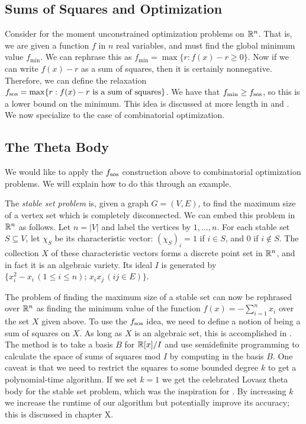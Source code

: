 \subsection{Sums of Squares and Optimization}
Consider for the moment unconstrained optimization problems on $\mathbb{R}^n$. 
That  is, we are given a function $f$ in $n$ real variables, and must find the global minimum value $f_{\min}$. 
We can rephrase this as $f_{\min} = \max \{r: f(x) - r \ge 0\}$. 
Now if we can write $f(x) - r$ as a sum of squares, then it is certainly nonnegative. 
Therefore, we can define the relaxation $f_{\textup{sos}} = \max \{r: f(x) - r \textup{ is a sum of squares}\}$.
We have that $f_{\min} \ge f_{\textup{sos}}$, so this is a lower bound on the minimum. 
This idea is discussed at more length in \cite{sostools} and \cite{lasserre}. 
We now specialize to the case of combinatorial optimization.

\subsection{The Theta Body}
We would like to apply the $f_{\textup{sos}}$ construction above to combinatorial optimization problems. 
We will explain how to do this through an example.

The {\em stable set problem} is, given a graph $G = (V,E)$, to find the maximum size of a vertex set which is completely disconnected. 
We can embed this problem in $\mathbb{R}^n$ as follows. 
Let $n = |V|$ and label the vertices by $1, \ldots, n$. 
For each stable set $S \subseteq V$, let $\chi_S$ be its characteristic vector: $(\chi_S)_i = 1$ if $i \in S$, and 0 if $i \notin S$.
The collection $X$ of these characteristic vectors forms a discrete point set in $\mathbb{R}^n$, and in fact it is an algebraic variety. 
Its ideal $I$ is generated by $\{x_i^2 - x_i \, (1\le i \le n);\, x_ix_j\, (ij \in E) \}$.

The problem of finding the maximum size of a stable set can now be rephrased over $\mathbb{R}^n$ as finding the minimum value of the function $f(x) = - \sum_{i=1}^n x_i$ over the set $X$ given above. 
To use the $f_{\textup{sos}}$ idea, we need to define a notion of being a sum of squares on $X$. As long as $X$ is an algebraic set, this is accomplished in \cite{glpt}. 
The method is to take a basis $B$ for $\mathbb{R}[x]/I$ and use semidefinite programming to calculate the space of sums of squares mod $I$ by computing in the basis $B$.
One caveat is that we need to restrict the squares to some bounded degree $k$ to get a polynomial-time algorithm. 
If we set $k=1$ we get the celebrated Lovasz theta body for the stable set problem, which was the inspiration for \cite{glpt}. 
By increasing $k$ we increase the runtime of our algorithm but potentially improve its accuracy; this is discussed in chapter X. 

